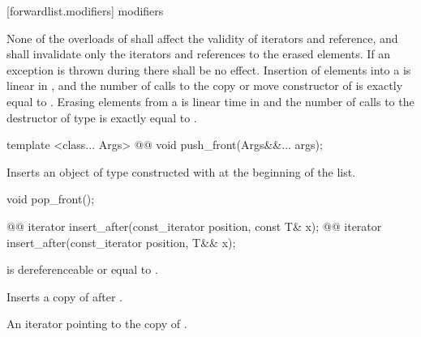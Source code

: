 \documentclass[american,twoside]{book}
\begin{document}
[forwardlist.modifiers]{ modifiers}

\pnum
None of the overloads of  shall affect the validity of iterators and reference, and  shall invalidate only the iterators and references to the erased elements. If an exception is thrown during   there shall be no effect. Insertion of  elements into a  is linear in , and the number of calls to the copy or move constructor of  is exactly equal to . Erasing  elements from a  is linear time in  and the number of calls to the destructor of type  is exactly equal to .

\begin{itemdecl}
template <class... Args> 
  @@ 
  void push_front(Args&&... args);
\end{itemdecl}

\begin{itemdescr}
\pnum
\effects Inserts an object of type  constructed with  at the beginning of the list.
\end{itemdescr}

\begin{itemdecl}
void pop_front();
\end{itemdecl}

\begin{itemdescr}
\pnum
\effects {}
\end{itemdescr}

\begin{itemdecl}
@@ 
  iterator insert_after(const_iterator position, const T& x);
@@ 
  iterator insert_after(const_iterator position, T&& x);
\end{itemdecl}

\begin{itemdescr}
\pnum
\requires {} is dereferenceable or equal to .

\pnum
\effects Inserts a copy of  after .

\pnum
\returns An iterator pointing to the copy of .
\end{itemdescr}
\end{document}

